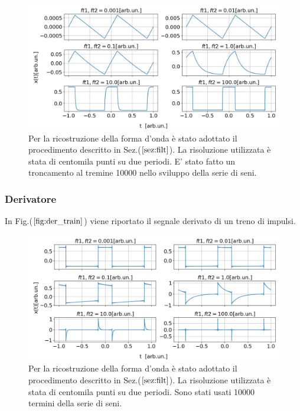 \documentclass{article}
\begin{document}
                    \begin{figure}[H]
                        \centering
                        \includegraphics[width=1\textwidth]{int_train1.png} %
                        \caption{Per la ricostruzione della forma d'onda è stato adottato 
                        il procedimento descritto in Sez.($\ref{sez:filt}$).
                        La risoluzione utilizzata è stata di centomila punti su due periodi.
                        E' stato fatto un troncamento al tremine 10000
                        nello sviluppo della serie di seni.}
                        \label{fig:int_train}
                    \end{figure}               

            \subsubsection{Derivatore}
                In Fig.($\ref{fig:der_train}$) viene riportato il segnale derivato di un treno di impulsi.     
                    
                    \begin{figure}[H]
                        \centering
                        \includegraphics[width=1\textwidth]{der_train.png} %
                        \caption{Per la ricostruzione della forma d'onda è stato adottato 
                        il procedimento descritto in Sez.($\ref{sez:filt}$).
                        La risoluzione utilizzata è stata di centomila punti su due periodi.
                        Sono stati usati 10000 termini della serie di seni.}
                        \label{fig:der_train}
                    \end{figure}    
\end{document}
